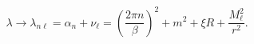 \begin{equation}
\lambda \rightarrow \lambda _{n\ell }=\alpha _{n}+\nu _{\ell }=\left(\frac{2\pi n}{\beta }\right)^{2}+m^{2}+\xi R+\frac{M_{\ell }^{2}}{r^{2}}.\end{equation}

